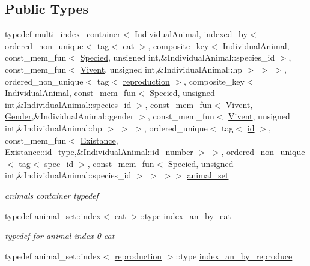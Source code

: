 \subsection*{Public Types}
\begin{DoxyCompactItemize}
\item 
typedef multi\_\-index\_\-container$<$ \hyperlink{classIndividualAnimal}{IndividualAnimal}, indexed\_\-by$<$ ordered\_\-non\_\-unique$<$ tag$<$ \hyperlink{structSubsystemContainer_1_1eat}{eat} $>$, composite\_\-key$<$ \hyperlink{classIndividualAnimal}{IndividualAnimal}, const\_\-mem\_\-fun$<$ \hyperlink{classSpecied}{Specied}, unsigned int,\&IndividualAnimal::species\_\-id $>$, const\_\-mem\_\-fun$<$ \hyperlink{classVivent}{Vivent}, unsigned int,\&IndividualAnimal::hp $>$ $>$ $>$, ordered\_\-non\_\-unique$<$ tag$<$ \hyperlink{structSubsystemContainer_1_1reproduction}{reproduction} $>$, composite\_\-key$<$ \hyperlink{classIndividualAnimal}{IndividualAnimal}, const\_\-mem\_\-fun$<$ \hyperlink{classSpecied}{Specied}, unsigned int,\&IndividualAnimal::species\_\-id $>$, const\_\-mem\_\-fun$<$ \hyperlink{classVivent}{Vivent}, \hyperlink{classGender}{Gender},\&IndividualAnimal::gender $>$, const\_\-mem\_\-fun$<$ \hyperlink{classVivent}{Vivent}, unsigned int,\&IndividualAnimal::hp $>$ $>$ $>$, ordered\_\-unique$<$ tag$<$ \hyperlink{structSubsystemContainer_1_1id}{id} $>$, const\_\-mem\_\-fun$<$ \hyperlink{classExistance}{Existance}, \hyperlink{classExistance_a82c4092964457cd7da30d53072c62f1a}{Existance::id\_\-type},\&IndividualAnimal::id\_\-number $>$ $>$, ordered\_\-non\_\-unique$<$ tag$<$ \hyperlink{structSubsystemContainer_1_1spec__id}{spec\_\-id} $>$, const\_\-mem\_\-fun$<$ \hyperlink{classSpecied}{Specied}, unsigned int,\&IndividualAnimal::species\_\-id $>$ $>$ $>$$>$ \hyperlink{classSubsystemContainer_a8f87e58293188f19a139b1f9ac21fe3e}{animal\_\-set}
\begin{DoxyCompactList}\small\item\em animals container typedef \end{DoxyCompactList}\item 
\hypertarget{classSubsystemContainer_ad6392db27e78a340c21252e63edbe55f}{
typedef animal\_\-set::index$<$ \hyperlink{structSubsystemContainer_1_1eat}{eat} $>$::type \hyperlink{classSubsystemContainer_ad6392db27e78a340c21252e63edbe55f}{index\_\-an\_\-by\_\-eat}}
\label{classSubsystemContainer_ad6392db27e78a340c21252e63edbe55f}

\begin{DoxyCompactList}\small\item\em typedef for animal index 0 eat \end{DoxyCompactList}\item 
\hypertarget{classSubsystemContainer_a08f08e93dceda155601c8ff6ed31839e}{
typedef animal\_\-set::index$<$ \hyperlink{structSubsystemContainer_1_1reproduction}{reproduction} $>$::type \hyperlink{classSubsystemContainer_a08f08e93dceda155601c8ff6ed31839e}{index\_\-an\_\-by\_\-reproduce}}
\label{classSubsystemContainer_a08f08e93dceda155601c8ff6ed31839e}


\end{DoxyCompactItemize}
